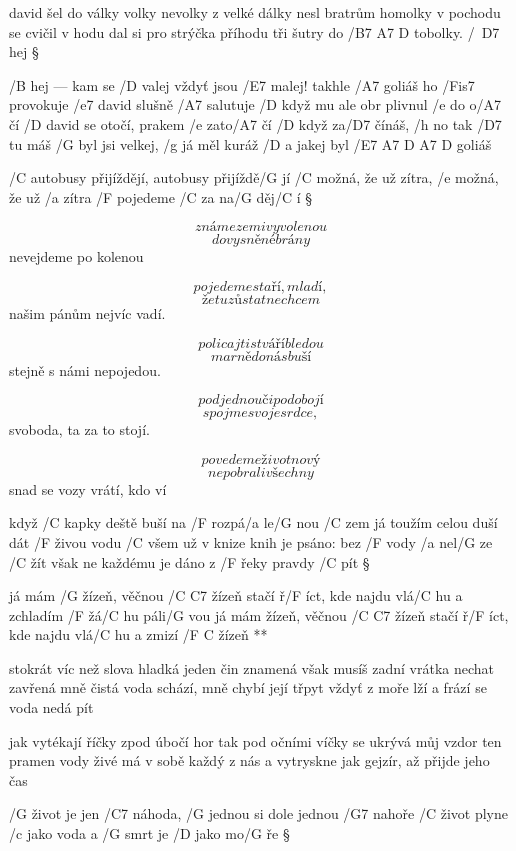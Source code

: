 david šel do války volky nevolky
z velké dálky nesl bratrům homolky
v pochodu se cvičil v hodu %
dal si pro strýčka příhodu
tři šutry do /{B7 A7 D} tobolky. /\ D7 hej \S

/B hej --- kam se /D valej vždyť jsou /E7 malej!
takhle /A7 goliáš ho /Fis7 provokuje
/e7 david slušně /A7 salutuje
/D když mu ale obr plivnul /e do o/A7 čí
/D david se otočí, prakem /e zato/A7 čí
/D když za/D7 čínáš, /h no tak /D7 tu máš
/G byl jsi velkej, /g já měl kuráž %
/D a jakej byl /{E7 A7 D A7 D} goliáš




/C autobusy přijíždějí, autobusy přijíždě/G jí
/C možná, že už zítra, /e možná, že už /a zítra
/F pojedeme /C za na/G děj/C í \S

\[ známe zemi vyvolenou \]
\[ do vysněné brány \]
nevejdeme po kolenou \s

\[ pojedeme staří, mladí, \]
\[ že tu zůstat nechcem \]
našim pánům nejvíc vadí. \s

\[ policajti s tváří bledou \]
\[ marně do nás buší \]
stejně s námi nepojedou. \s

\[ pod jednou či podobojí \]
\[ spojme svoje srdce, \]
svoboda, ta za to stojí. \s

\[ povedeme život nový \]
\[ nepobrali všechny \]
snad se vozy vrátí, kdo ví \s




když /C kapky deště buší na /F rozpá/a le/G nou /C zem
já toužím celou duší dát /F živou vodu /C všem
už v knize knih je psáno: bez /F vody /a nel/G ze /C žít
však ne každému je dáno z /F řeky pravdy /C pít \S

\R já mám /G žízeň, věčnou /{C C7} žízeň
   stačí ř/F íct, kde najdu vlá/C hu a zchladím /F žá/C hu páli/G vou
   já mám žízeň, věčnou /{C C7} žízeň
   stačí ř/F íct, kde najdu vlá/C hu a zmizí /{F C} žízeň **

stokrát víc než slova hladká jeden čin znamená
však musíš zadní vrátka nechat zavřená
mně čistá voda schází, mně chybí její třpyt
vždyť z moře lží a frází se voda nedá pít \s

jak vytékají říčky zpod úbočí hor
tak pod očními víčky se ukrývá můj vzdor
ten pramen vody živé má v sobě každý z nás
a vytryskne jak gejzír, až přijde jeho čas




/G život je jen /C7 náhoda, /G jednou si dole jednou /G7 nahoře
/C život plyne /c jako voda a /G smrt je /D jako mo/G ře \S

